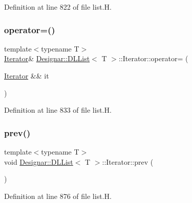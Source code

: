 Definition at line 822 of file list.\+H.

\mbox{\label{class_designar_1_1_d_l_list_1_1_iterator_a92bdff852753fecd794b5691419858a8}} 
\subsubsection{\texorpdfstring{operator=()}{operator=()}\hspace{0.1cm}{\footnotesize\ttfamily [2/2]}}
{\footnotesize\ttfamily template$<$typename T$>$ \\
\hyperlink{class_designar_1_1_d_l_list_1_1_iterator}{Iterator}\& \hyperlink{class_designar_1_1_d_l_list}{Designar\+::\+D\+L\+List}$<$ T $>$\+::Iterator\+::operator= (\begin{DoxyParamCaption}\item[{\hyperlink{class_designar_1_1_d_l_list_1_1_iterator}{Iterator} \&\&}]{it }\end{DoxyParamCaption})\hspace{0.3cm}{\ttfamily [inline]}}



Definition at line 833 of file list.\+H.

\mbox{\label{class_designar_1_1_d_l_list_1_1_iterator_ac713eeea83e3e32a939067614a13c41d}} 
\subsubsection{\texorpdfstring{prev()}{prev()}}
{\footnotesize\ttfamily template$<$typename T$>$ \\
void \hyperlink{class_designar_1_1_d_l_list}{Designar\+::\+D\+L\+List}$<$ T $>$\+::Iterator\+::prev (\begin{DoxyParamCaption}{ }\end{DoxyParamCaption})\hspace{0.3cm}{\ttfamily [inline]}}



Definition at line 876 of file list.\+H.

